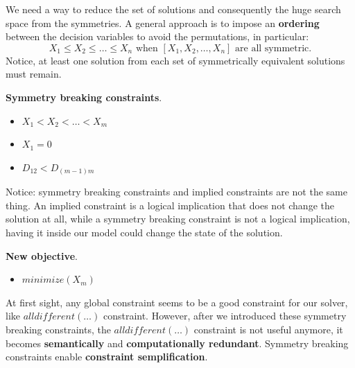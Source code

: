 We need a way to reduce the set of solutions and consequently the huge search space from the symmetries. A general approach is to impose an \textbf{ordering}
between the decision variables to avoid the permutations, in particular:
$$ X_1 \leq X_2 \leq \dots \leq X_n \text{ when } [X_1, X_2, \dots, X_n] \text{ are all symmetric.} $$
Notice, at least one solution from each set of symmetrically equivalent solutions must remain.
\begin{example}[title = Improved model]
    \textbf{Symmetry breaking constraints}.
    \begin{itemize}
        \renewcommand{\labelitemi}{-}
        \item $X_1 < X_2 < \dots < X_m$
        \item $X_1 = 0$
        \item $D_{12} < D_{(m-1)m}$
    \end{itemize} \vspace{7pt}
    Notice: symmetry breaking constraints and implied constraints are not the same thing. An implied constraint is a logical implication that does not change the solution at all, while a symmetry breaking constraint is not a logical implication, having it inside our model could change the state of the solution. \vspace{7pt}

    \textbf{New objective}. 
    \begin{itemize}
        \renewcommand{\labelitemi}{-}
        \item $\textit{minimize}(X_m)$
    \end{itemize}
\end{example}
At first sight, any global constraint seems to be a good constraint for our solver, like $\textit{alldifferent}(\dots)$ constraint. However, after we 
introduced these symmetry breaking constraints, the $\textit{alldifferent}(\dots)$ constraint is not useful anymore, it becomes \textbf{semantically} and \textbf{computationally
redundant}. Symmetry breaking constraints enable \textbf{constraint semplification}.
